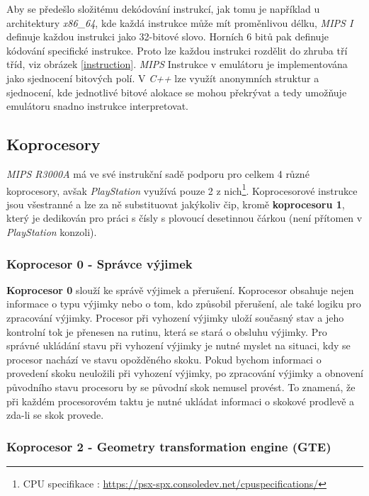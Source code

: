 Aby se předešlo složitému dekódování instrukcí, jak tomu je například u architektury \textit{x86\_64}, 
kde každá instrukce může mít proměnlivou délku, \textit{MIPS I} definuje každou instrukci jako 32-bitové slovo. 
Horních 6 bitů pak definuje kódování specifické instrukce. Proto lze každou instrukci rozdělit do zhruba tří tříd, viz obrázek \ref{instruction}. \textit{MIPS} Instrukce v emulátoru je implementována jako sjednocení bitových polí. V \textit{C++} lze využít anonymních struktur a sjednocení, kde jednotlivé bitové alokace se mohou překrývat a tedy umožňuje emulátoru snadno instrukce interpretovat.

\subsection{Koprocesory}

\textit{MIPS R3000A} má ve své instrukční sadě podporu pro celkem 4 různé koprocesory, avšak \textit{PlayStation} využívá pouze 2 z nich\footnote{CPU specifikace \cite{PSXSpec}: \url{https://psx-spx.consoledev.net/cpuspecifications/}}. 
Koprocesorové instrukce jsou všestranné a lze za ně substituovat jakýkoliv čip, kromě \textbf{koprocesoru 1}, který je dedikován pro práci s čísly s plovoucí desetinnou čárkou \cite{MIPSInsSpec} (není přítomen v \textit{PlayStation} konzoli).

\subsubsection{Koprocesor 0 - Správce výjimek}

\textbf{Koprocesor 0} slouží ke správě výjimek a přerušení. 
Koprocesor obsahuje nejen informace o typu výjimky nebo o tom, kdo způsobil přerušení, ale také logiku pro zpracování výjimky. 
Procesor při vyhození výjimky uloží současný stav a jeho kontrolní tok je přenesen na rutinu, která se stará o obsluhu výjimky.
Pro správné ukládání stavu při vyhození výjimky je nutné myslet na situaci, kdy se procesor
nachází ve stavu opožděného skoku. Pokud bychom informaci o provedení skoku neuložili při vyhození výjimky,
po zpracování výjimky a obnovení původního stavu procesoru by se původní skok nemusel provést.
To znamená, že při každém procesorovém taktu je nutné ukládat informaci o skokové prodlevě a
zda-li se skok provede.

\subsubsection{Koprocesor 2 - Geometry transformation engine (GTE)}

